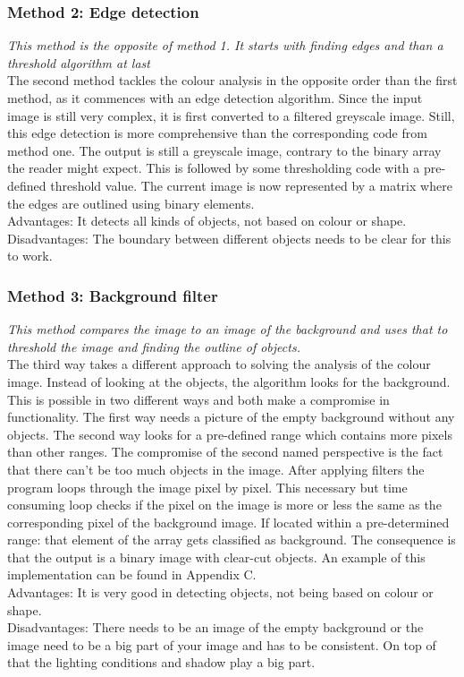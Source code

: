 \documentclass{article}
\begin{document}
\subsubsection{Method 2: Edge detection}
\textit{This method is the opposite of method 1. It starts with finding edges and than a threshold algorithm at last}\\
The second method tackles the colour analysis in the opposite order than the first method, as it commences with an edge detection algorithm. Since the input image is still very complex, it is first converted to a filtered greyscale image. Still, this edge detection is more comprehensive than the corresponding code from method one. The output is still a greyscale image, contrary to the binary array the reader might expect. This is followed by some thresholding code with a pre-defined threshold value. The current image is now represented by a matrix where the edges are outlined using binary elements.
\\Advantages: It detects all kinds of objects, not based on colour or shape.
\\Disadvantages: The boundary between different objects needs to be clear for this to work.
\subsubsection{Method 3: Background filter}
\textit{This method compares the image to an image of the background and uses that to threshold the image and finding the outline of objects.}\\
The third way takes a different approach to solving the analysis of the colour image. Instead of looking at the objects, the algorithm looks for the background. This is possible in two different ways and both make a compromise in functionality. The first way needs a picture of the empty background without any objects. The second way looks for a pre-defined range which contains more pixels than other ranges. The compromise of the second named perspective is the fact that there can't be too much objects in the image. After applying filters the program loops through the image pixel by pixel. This necessary but time consuming loop checks if the pixel on the image is more or less the same as the corresponding pixel of the background image. If located within a pre-determined range: that element of the array gets classified as background. The consequence is that the output is a binary image with clear-cut objects. An example of this implementation can be found in Appendix C. 
\\Advantages: It is very good in detecting objects, not being based on colour or shape.
\\Disadvantages: There needs to be an image of the empty background or the image need to be a big part of your image and has to be consistent. On top of that the lighting conditions and shadow play a big part. 
\end{document}

